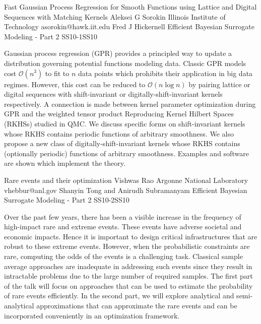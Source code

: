 \begin{talk}
  {Fast Gaussian Process Regression for Smooth Functions using Lattice and Digital Sequences with Matching Kernels}%
  {Aleksei G Sorokin}%
  {Illinois Institute of Technology}%
  {asorokin@hawk.iit.edu}%
  {Fred J Hickernell}%
{Efficient Bayesian Surrogate Modeling - Part 2}
{}{SS10-1}{SS10}


				
				

Gaussian process regression (GPR) provides a principled way to update a distribution governing potential functions modeling data. Classic GPR  models cost $\mathcal{O}(n^3)$ to fit to $n$ data points which prohibits their application in big data regimes. However, this cost can be reduced to $\mathcal{O}(n \log n)$ by pairing lattice or digital sequences with shift-invariant or digitally-shift-invariant kernels respectively. A connection is made between kernel parameter optimization during GPR and the weighted tensor product Reproducing Kernel Hilbert Spaces (RKHSs) studied in QMC. We discuss specific forms on shift-invariant kernels whose RKHS contains periodic functions of arbitrary smoothness. We also propose a new class of digitally-shift-invariant kernels whose RKHS contains (optionally periodic) functions of arbitrary smoothness. Examples and software are shown which implement the theory.
\end{talk}

\begin{talk}
{Rare events and their optimization}
{Vishwas Rao}
{Argonne National Laboratory}
{vhebbur@anl.gov}
{Shanyin Tong and Anirudh Subramanyam }
{Efficient Bayesian Surrogate Modeling - Part 2}
{}{SS10-2}{SS10}



Over the past few years, there has been a visible increase in the frequency of high-impact rare and extreme events. These events have adverse societal and economic impacts. Hence it is important to design critical infrastructures that are robust to these extreme events. However, when the probabilistic constraints are rare, computing the odds of the events is a challenging task. Classical sample average approaches are inadequate in addressing such events since they result in intractable problems due to the large number of required samples. The first part of the talk will focus on approaches that can be used to estimate the probability of rare events efficiently. In the second part, we will explore analytical and semi-analytical approximations that can approximate the rare events and can be incorporated conveniently in an optimization framework.

\end{talk}

